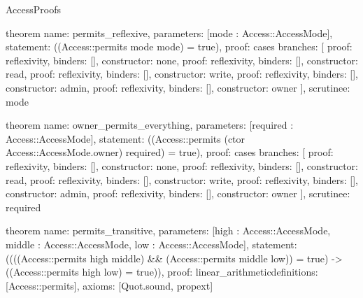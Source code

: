 \begin{lexlean}{AccessProofs}
\begin{semanticmodule}
theorem{
  name: permits_reflexive,
  parameters: [mode : Access::AccessMode],
  statement: ((Access::permits mode mode) = true),
  proof: cases{
    branches: [
      {proof: reflexivity{}, binders: [], constructor: none},
      {proof: reflexivity{}, binders: [], constructor: read},
      {proof: reflexivity{}, binders: [], constructor: write},
      {proof: reflexivity{}, binders: [], constructor: admin},
      {proof: reflexivity{}, binders: [], constructor: owner}
    ],
    scrutinee: mode
  }
}

theorem{
  name: owner_permits_everything,
  parameters: [required : Access::AccessMode],
  statement: ((Access::permits (ctor Access::AccessMode.owner) required) = true),
  proof: cases{
    branches: [
      {proof: reflexivity{}, binders: [], constructor: none},
      {proof: reflexivity{}, binders: [], constructor: read},
      {proof: reflexivity{}, binders: [], constructor: write},
      {proof: reflexivity{}, binders: [], constructor: admin},
      {proof: reflexivity{}, binders: [], constructor: owner}
    ],
    scrutinee: required
  }
}

theorem{
  name: permits_transitive,
  parameters: [high : Access::AccessMode, middle : Access::AccessMode, low : Access::AccessMode],
  statement: ((((Access::permits high middle) && (Access::permits middle low)) = true) -> ((Access::permits high low) = true)),
  proof: linear_arithmetic{definitions: [Access::permits]},
  axioms: [Quot.sound, propext]
}
\end{semanticmodule}
\end{lexlean}
